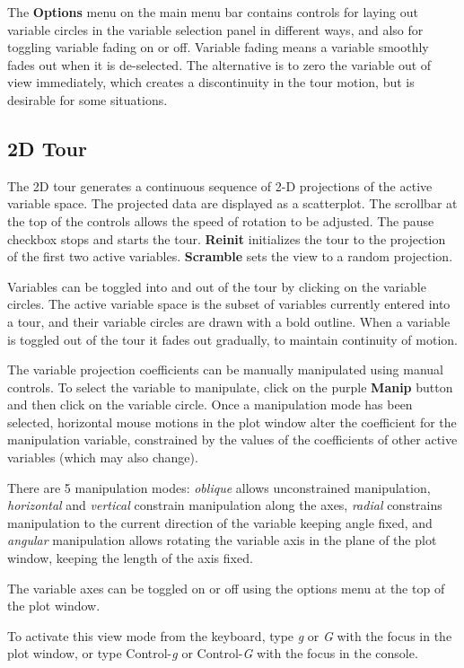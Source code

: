 \documentclass[11pt]{article}
\begin{document}
The {\bf Options} menu on the main menu bar contains controls for
laying out variable circles in the variable selection panel in
different ways, and also for toggling variable fading on or
off. Variable fading means a variable smoothly fades out when it is
de-selected. The alternative is to zero the variable out of view
immediately, which creates a discontinuity in the tour motion, but is
desirable for some situations.

\subsection{2D Tour}
\label{slbl:2DTour}

The 2D tour generates a continuous sequence of 2-D projections of the
active variable space. The projected data are displayed as a
scatterplot. The scrollbar at the top of the controls allows the speed
of rotation to be adjusted. The pause checkbox stops and starts the
tour. {\bf Reinit} initializes the tour to the projection of the first two
active variables. {\bf Scramble} sets the view to a random projection.

Variables can be toggled into and out of the tour by clicking on the
variable circles. The active variable space is the subset of variables
currently entered into a tour, and their variable circles are drawn with
a bold outline. When a variable is toggled out of the tour it fades out
gradually, to maintain continuity of motion.

The variable projection coefficients can be manually manipulated using
manual controls. To select the variable to manipulate, click on the
purple {\bf Manip} button and then click on the variable circle. 
Once a manipulation mode has been selected,
horizontal mouse motions in the plot window alter the coefficient for
the manipulation variable, constrained by the values of the coefficients
of other active variables (which may also change).

There are 5 manipulation modes: {\it oblique} allows unconstrained
manipulation, {\it horizontal} and {\it vertical} constrain manipulation
along the axes, {\it radial} constrains manipulation to the current
direction of the variable keeping angle fixed, and {\it angular}
manipulation allows rotating the variable axis in the plane of the plot
window, keeping the length of the axis fixed.

The variable axes can be toggled on or off using the options menu at
the top of the plot window.

To activate this view mode from the keyboard, type {\em g} or {\em G}
with the focus in the plot window, or type Control-{\em g} or
Control-{\em G} with the focus in the console.
\end{document}

